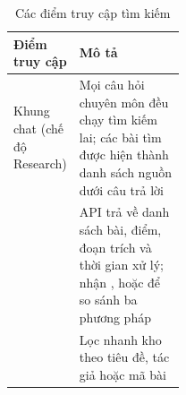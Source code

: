 \begin{table}[H]
\centering\small{}
\begin{tabularx}{\linewidth}{@{}P{0.38\linewidth}L@{}}
\toprule
\textbf{Điểm truy cập} & \textbf{Mô tả}\\
\midrule
Khung chat (chế độ Research) & Mọi câu hỏi chuyên môn đều chạy tìm kiếm lai; các bài tìm được hiện thành danh sách nguồn dưới câu trả lời\\
 & API trả về danh sách bài, điểm, đoạn trích và thời gian xử lý;  nhận ,  hoặc  để so sánh ba phương pháp\\
 & Lọc nhanh kho theo tiêu đề, tác giả hoặc mã bài\\
\bottomrule
\end{tabularx}
\caption{Các điểm truy cập tìm kiếm}\label{tab:truycap}
\end{table}
